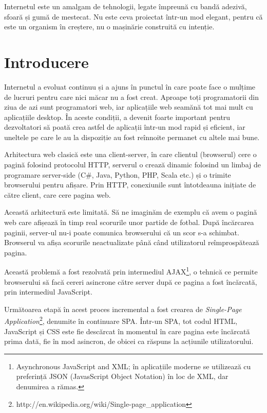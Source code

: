 \begin{savequote}[75mm]
Internetul este un amalgam de tehnologii, legate împreună cu bandă adezivă,
sfoară și gumă de mestecat. Nu este ceva proiectat într-un mod elegant,
pentru că este un organism în creștere, nu o mașinărie construită
cu intenție.
\end{savequote}

\chapter{Introducere}

Internetul a evoluat continuu și a ajuns în punctul în care poate face o mulțime
de lucruri pentru care nici măcar nu a fost creat. Aproape toți programatorii din
ziua de azi sunt programatori web, iar aplicațiile web seamănă tot mai mult cu 
aplicațiile desktop. În aceste condiții, a devenit foarte important pentru
dezvoltatori să poată crea astfel de aplicații într-un mod rapid și eficient, 
iar uneltele pe care le au la dispoziție au fost reînnoite permanet cu altele
mai bune.

Arhitectura web clasică este una client-server, în care clientul (browserul)
cere o pagină folosind protocolul HTTP, serverul o crează dinamic folosind un 
limbaj de programare server-side (C\#, Java, Python, PHP, Scala etc.) și o trimite 
browserului pentru afișare. Prin HTTP, conexiunile sunt întotdeauna inițiate 
de către client, care cere pagina web.

Această arhitectură este limitată. Să ne imaginăm de exemplu că avem o pagină
web care afișează în timp real scorurile unor partide de fotbal. După încărcarea
paginii, server-ul nu-i poate comunica browserului că un scor s-a schimbat.
Browserul va afișa scorurile neactualizate până când utilizatorul reîmprospătează
pagina.

Această problemă a fost rezolvată prin intermediul
AJAX\footnote{Asynchronous JavaScript and XML; în aplicațiile moderne
se utilizează cu preferință JSON (JavasScript Object Notation) în loc de XML,
dar denumirea a rămas.},
o tehnică ce permite browserului să facă cereri asincrone către server după ce 
pagina a fost încărcată, prin intermediul JavaScript.

Următoarea etapă în acest proces incremental a fost crearea de 
\emph{Single-Page Application}\footnote{http://en.wikipedia.org/wiki/Single-page\_application},
denumite în continuare SPA. Într-un SPA, tot codul HTML, JavaScript și CSS este
fie descărcat în momentul în care pagina este încărcată prima dată, fie în mod asincron, de obicei ca
răspuns la acțiunile utilizatorului.

